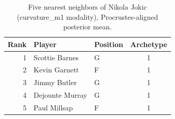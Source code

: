 \begin{table}[htbp]
  \centering\small
  \begin{tabular}{rllc}
    \toprule
    Rank & Player & Position & Archetype \\
    \midrule
    1 & Scottie Barnes & G & 1 \\
    2 & Kevin Garnett & F & 1 \\
    3 & Jimmy Butler & G & 1 \\
    4 & Dejounte Murray & G & 1 \\
    5 & Paul Millsap & F & 1 \\
    \bottomrule
  \end{tabular}
  \caption{Five nearest neighbors of Nikola Jokic (curvature_m1 modality), Procrustes-aligned posterior mean.}
  \label{tab:Nikola_Jokic_neighbors_curvature_m1}
\end{table}

